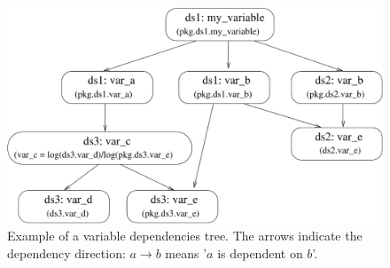 {\begin{figure}
\begin{center}
\includegraphics[scale=0.6]{images/variabletreeinitial.pdf}
\caption{\label{fig:opus-core-variable-tree}\small Example of a variable
  dependencies tree. The arrows indicate the dependency direction: 
  $a \longrightarrow b$ means '$a$ is dependent on $b$'.}
\end{center}
\end{figure}

}
